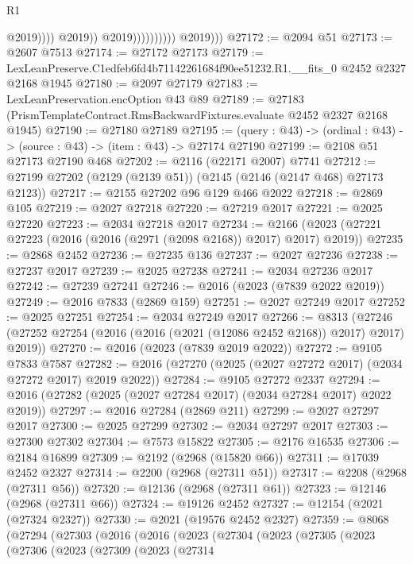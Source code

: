 \begin{lexlean}{R1}
\begin{coremodule}
                                          @2019))))
                                  @2019))
                              @2019))))))))))
          @2019)))
@27172 := @2094 @51
@27173 := @2607 @7513
@27174 := @27172 @27173
@27179 := LexLeanPreserve.C1edfeb6fd4b71142261684f90ee51232.R1.__fits_0 @2452 @2327 @2168 @1945
@27180 := @2097 @27179
@27183 := LexLeanPreservation.encOption @43 @89
@27189 := @27183 (PrismTemplateContract.RmsBackwardFixtures.evaluate @2452 @2327 @2168 @1945)
@27190 := @27180 @27189
@27195 := (query : @43) -> (ordinal : @43) -> (source : @43) -> (item : @43) -> @27174 @27190
@27199 := @2108 @51 @27173 @27190 @468
@27202 := @2116 (@22171 @2007) @7741
@27212 := @27199 @27202 (@2129 (@2139 @51)) (@2145 (@2146 (@2147 @468) @27173 @2123))
@27217 := @2155 @27202 @96 @129 @466 @2022
@27218 := @2869 @105
@27219 := @2027 @27218
@27220 := @27219 @2017
@27221 := @2025 @27220
@27223 := @2034 @27218 @2017
@27234 := @2166 (@2023 (@27221 @27223 (@2016 (@2016 (@2971 (@2098 @2168)) @2017) @2017) @2019))
@27235 := @2868 @2452
@27236 := @27235 @136
@27237 := @2027 @27236
@27238 := @27237 @2017
@27239 := @2025 @27238
@27241 := @2034 @27236 @2017
@27242 := @27239 @27241
@27246 := @2016 (@2023 (@7839 @2022 @2019))
@27249 := @2016 @7833 (@2869 @159)
@27251 := @2027 @27249 @2017
@27252 := @2025 @27251
@27254 := @2034 @27249 @2017
@27266 := @8313
    (@27246 (@27252 @27254 (@2016 (@2016 (@2021 (@12086 @2452 @2168)) @2017) @2017) @2019))
@27270 := @2016 (@2023 (@7839 @2019 @2022))
@27272 := @9105 @7833 @7587
@27282 := @2016 (@27270 (@2025 (@2027 @27272 @2017) (@2034 @27272 @2017) @2019 @2022))
@27284 := @9105 @27272 @2337
@27294 := @2016 (@27282 (@2025 (@2027 @27284 @2017) (@2034 @27284 @2017) @2022 @2019))
@27297 := @2016 @27284 (@2869 @211)
@27299 := @2027 @27297 @2017
@27300 := @2025 @27299
@27302 := @2034 @27297 @2017
@27303 := @27300 @27302
@27304 := @7573 @15822
@27305 := @2176 @16535
@27306 := @2184 @16899
@27309 := @2192 (@2968 (@15820 @66))
@27311 := @17039 @2452 @2327
@27314 := @2200 (@2968 (@27311 @51))
@27317 := @2208 (@2968 (@27311 @56))
@27320 := @12136 (@2968 (@27311 @61))
@27323 := @12146 (@2968 (@27311 @66))
@27324 := @19126 @2452
@27327 := @12154 (@2021 (@27324 @2327))
@27330 := @2021 (@19576 @2452 @2327)
@27359 := @8068
    (@27294
      (@27303
        (@2016
          (@2016
            (@2023
              (@27304
                (@2023
                  (@27305
                    (@2023
                      (@27306
                        (@2023
                          (@27309
                            (@2023
                              (@27314

\end{coremodule}
\end{lexlean}
